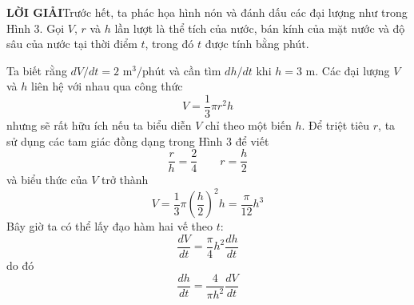 \begin{minipage}[t]{0.71\textwidth}
  \vspace{8pt}
  \noindent\textbf{\textcolor{stewartblue}{LỜI GIẢI}}\quad Trước hết, ta phác họa hình nón và đánh dấu các đại lượng như trong Hình 3. Gọi $V$, $r$ và $h$ lần lượt là thể tích của nước, bán kính của mặt nước và độ sâu của nước tại thời điểm $t$, trong đó $t$ được tính bằng phút.

  \vspace{4pt}
  Ta biết rằng $dV/dt = 2\text{ m}^3\text{/phút}$ và cần tìm $dh/dt$ khi $h = 3\text{ m}$. Các đại lượng $V$ và $h$ liên hệ với nhau qua công thức
  \[
  V = \frac{1}{3}\pi r^2 h
  \]
  nhưng sẽ rất hữu ích nếu ta biểu diễn $V$ chỉ theo một biến $h$. Để triệt tiêu $r$, ta sử dụng các tam giác đồng dạng trong Hình 3 để viết
  \[
  \frac{r}{h} = \frac{2}{4} \qquad r = \frac{h}{2}
  \]
  và biểu thức của $V$ trở thành
  \[
  V = \frac{1}{3}\pi \left(\frac{h}{2}\right)^2 h = \frac{\pi}{12} h^3
  \]
  Bây giờ ta có thể lấy đạo hàm hai vế theo $t$:
  \[
  \frac{dV}{dt} = \frac{\pi}{4} h^2 \frac{dh}{dt}
  \]
  \noindent do đó
  \[
  \frac{dh}{dt} = \frac{4}{\pi h^2} \frac{dV}{dt}
  \]
\end{minipage}

\vfill
\noindent{\tiny\textcolor{gray!80}{Copyright 2021 Cengage Learning. All Rights Reserved. May not be copied, scanned, or duplicated, in whole or in part. WCN 02-200-203}}
